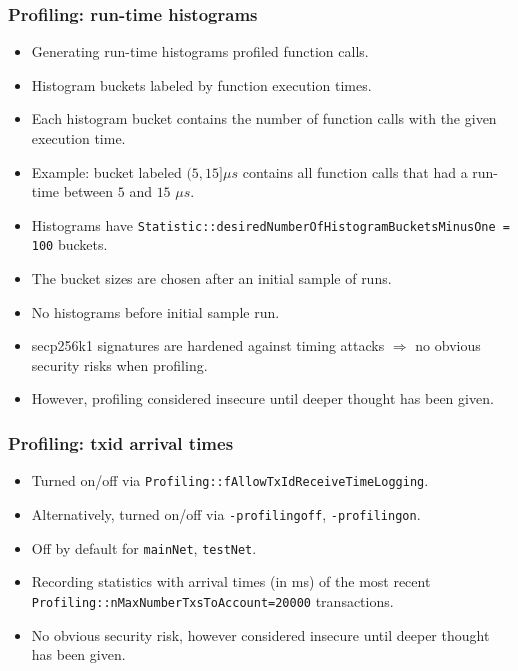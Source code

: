 \begin{frame}[fragile]
\frametitle{Profiling: run-time histograms}
\begin{itemize}
\item Generating run-time histograms profiled function calls. 
\item Histogram buckets labeled by function execution times.
\item Each histogram bucket contains the number of function calls with the given execution time.
\item Example: bucket labeled $(5,15] \mu s$ contains all function calls that had a run-time between $5$ and $15$ $\mu s$.
\item Histograms have \verb|Statistic::desiredNumberOfHistogramBucketsMinusOne = 100| buckets.
\item The bucket sizes are chosen after an initial sample of runs.
\item No histograms before initial sample run.
\item secp256k1 signatures are hardened against timing attacks $\Rightarrow$ no obvious security risks when profiling.
\item However, profiling considered insecure until deeper thought has been given.
\end{itemize}
\end{frame}
\begin{frame}[fragile]
\frametitle{Profiling: txid arrival times}
\begin{itemize}
\item Turned on/off via \verb|Profiling::fAllowTxIdReceiveTimeLogging|.
\item Alternatively, turned on/off via  \verb|-profilingoff|, \verb|-profilingon|.
\item Off by default for \verb|mainNet|, \verb|testNet|.
\item Recording statistics with arrival times (in ms) of the most recent \verb|Profiling::nMaxNumberTxsToAccount=20000| transactions.
\item No obvious security risk, however considered insecure until deeper thought has been given.
\end{itemize}
\end{frame}


